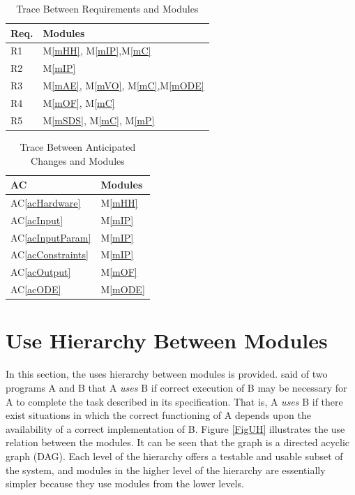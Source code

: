\documentclass[12pt, titlepage]{article}
\newcommand{\acref}[1]{AC\ref{#1}}
\newcommand{\mref}[1]{M\ref{#1}}
\begin{document}
\begin{table}[H]
\centering
\begin{tabular}{p{} p{}}
\toprule
\textbf{Req.} & \textbf{Modules}\\
\midrule
R1 & \mref{mHH}, \mref{mIP},\mref{mC}\\
R2 & \mref{mIP}\\
R3 & \mref{mAE}, \mref{mVO}, \mref{mC},\mref{mODE} \\
R4 & \mref{mOF}, \mref{mC}\\
R5 & \mref{mSDS}, \mref{mC}, \mref{mP}\\ 
\bottomrule
\end{tabular}
\caption{Trace Between Requirements and Modules}
\label{TblRT}
\end{table}

\begin{table}[H]
\centering
\begin{tabular}{p{} p{}}
\toprule
\textbf{AC} & \textbf{Modules}\\
\midrule
\acref{acHardware} & \mref{mHH}\\
\acref{acInput} & \mref{mIP}\\
\acref{acInputParam} & \mref{mIP}\\
\acref{acConstraints} & \mref{mIP}\\
\acref{acOutput} & \mref{mOF}\\
\acref{acODE} & \mref{mODE}\\
\bottomrule
\end{tabular}
\caption{Trace Between Anticipated Changes and Modules}
\label{TblACT}
\end{table}


\section{Use Hierarchy Between Modules} \label{SecUse}

In this section, the uses hierarchy between modules is
provided. \citet{Parnas1978} said of two programs A and B that A {\em uses} B if
correct execution of B may be necessary for A to complete the task described in
its specification. That is, A {\em uses} B if there exist situations in which
the correct functioning of A depends upon the availability of a correct
implementation of B.  Figure \ref{FigUH} illustrates the use relation between
the modules. It can be seen that the graph is a directed acyclic graph
(DAG). Each level of the hierarchy offers a testable and usable subset of the
system, and modules in the higher level of the hierarchy are essentially simpler
because they use modules from the lower levels.
\end{document}
